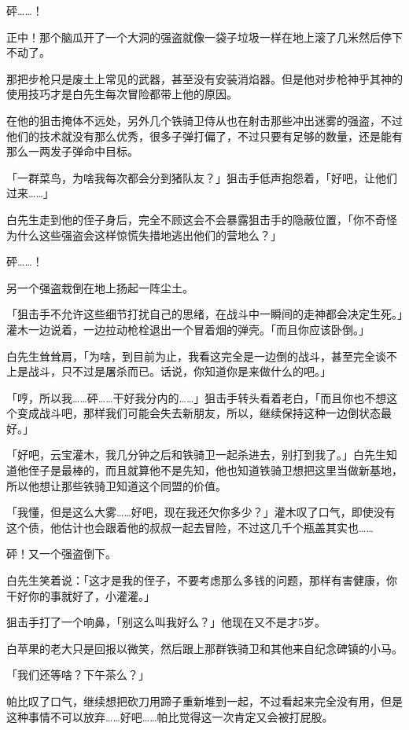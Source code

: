 砰……！

正中！那个脑瓜开了一个大洞的强盗就像一袋子垃圾一样在地上滚了几米然后停下不动了。

那把步枪只是废土上常见的武器，甚至没有安装消焰器。但是他对步枪神乎其神的使用技巧才是白先生每次冒险都带上他的原因。

在他的狙击掩体不远处，另外几个铁骑卫侍从也在射击那些冲出迷雾的强盗，不过他们的技术就没有那么优秀，很多子弹打偏了，不过只要有足够的数量，还是能有那么一两发子弹命中目标。

「一群菜鸟，为啥我每次都会分到猪队友？」狙击手低声抱怨着，「好吧，让他们过来……」

白先生走到他的侄子身后，完全不顾这会不会暴露狙击手的隐蔽位置，「你不奇怪为什么这些强盗会这样惊慌失措地逃出他们的营地么？」

砰……！

另一个强盗栽倒在地上扬起一阵尘土。

「狙击手不允许这些细节打扰自己的思绪，在战斗中一瞬间的走神都会决定生死。」灌木一边说着，一边拉动枪栓退出一个冒着烟的弹壳。「而且你应该卧倒。」

白先生耸耸肩，「为啥，到目前为止，我看这完全是一边倒的战斗，甚至完全谈不上是战斗，只不过是屠杀而已。话说，你知道你是来做什么的吧。」

「哼，所以我……砰……干好我分内的……」狙击手转头看着老白，「而且你也不想这个变成战斗吧，那样我们可能会失去新朋友，所以，继续保持这种一边倒状态最好。」

「好吧，云宝灌木，我几分钟之后和铁骑卫一起杀进去，别打到我了。」白先生知道他侄子是最棒的，而且就算他不是先知，他也知道铁骑卫想把这里当做新基地，所以他想让那些铁骑卫知道这个同盟的价值。

「我懂，但是这么大雾……好吧，现在我还欠你多少？」灌木叹了口气，即使没有这个债，他估计也会跟着他的叔叔一起去冒险，不过这几千个瓶盖其实也……{}

砰！又一个强盗倒下。

白先生笑着说：「这才是我的侄子，不要考虑那么多钱的问题，那样有害健康，你干好你的事就好了，小灌灌。」

狙击手打了一个响鼻，「别这么叫我好么？」他现在又不是才5岁。

白苹果的老大只是回报以微笑，然后跟上那群铁骑卫和其他来自纪念碑镇的小马。

「我们还等啥？下午茶么？」

\horizonline


帕比叹了口气，继续想把砍刀用蹄子重新堆到一起，不过看起来完全没有用，但是这种事情不可以放弃……好吧……帕比觉得这一次肯定又会被打屁股。

